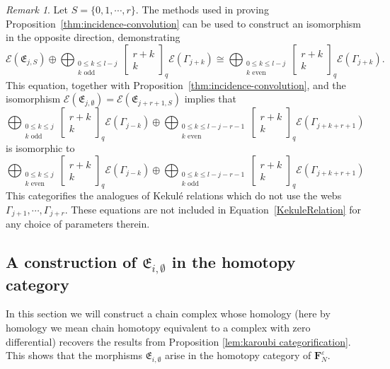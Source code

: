 \documentclass[12pt]{amsart}
\theoremstyle{definition}
\theoremstyle{remark}
\newtheorem{remark}[theorem]{Remark}
\numberwithin{equation}{section}
\numberwithin{figure}{section}
\newcommand{\Foam}{\mathbf{F}_N}
\newcommand{\osum}{\bigoplus}
\begin{document}
\begin{remark}
Let $S=\{0,1,\cdots,r\}$. The methods used in proving Proposition~\ref{thm:incidence-convolution} can be used to construct an isomorphism in the opposite direction, demonstrating 
    \[\mathcal E(\mathfrak{E}_{j,S}) \oplus \osum_{\substack{0\leq k\leq l-j\\ k\text{ odd}}} \begin{bmatrix}r+k\\k\end{bmatrix}_q \mathcal E(\Gamma_{j+k})
 \cong \osum_{\substack{0\leq k\leq l-j\\ k\text{ even}}}  \begin{bmatrix}r+k\\k\end{bmatrix}_q \mathcal E(\Gamma_{j+k}).\]
This equation, together with Proposition~\ref{thm:incidence-convolution}, and the isomorphism $\mathcal E(\mathfrak{E}_{j,\emptyset})=\mathcal E(\mathfrak{E}_{j+r+1,S})$ implies that 
 \[\osum_{\substack{0\leq k\leq j\\ k\text{ odd}}} \begin{bmatrix}r+k\\k\end{bmatrix}_q \mathcal E(\Gamma_{j-k})
 \oplus 
 \osum_{\substack{0\leq k\leq l-j-r-1\\ k\text{ even}}} \begin{bmatrix}r+k\\k\end{bmatrix}_q \mathcal E(\Gamma_{j+k+r+1})
 \] 
 is isomorphic to 
 \[\osum_{\substack{0\leq k\leq j\\ k\text{ even}}} \begin{bmatrix}r+k\\k\end{bmatrix}_q \mathcal E(\Gamma_{j-k})
 \oplus 
 \osum_{\substack{0\leq k\leq l-j-r-1\\ k\text{ odd}}} \begin{bmatrix}r+k\\k\end{bmatrix}_q \mathcal E(\Gamma_{j+k+r+1})
 \] 
 This categorifies the analogues of Kekulé relations which do not use the webs $\Gamma_{j+1},\cdots,\Gamma_{j+r}$. These equations are not included in Equation~\ref{KekuleRelation} for any choice of parameters therein. 
\end{remark}

\subsection{A construction of $\mathfrak{E}_{i,\emptyset}$ in the homotopy category}
In this section we will construct a chain complex whose homology (here by homology we mean chain homotopy equivalent to a complex with zero differential) recovers the results from Proposition \ref{lem:karoubi categorification}. This shows that the morphisms $\mathfrak{E}_{i,\emptyset}$ arise in the homotopy category of $\Foam^\varepsilon$. 
\end{document}
